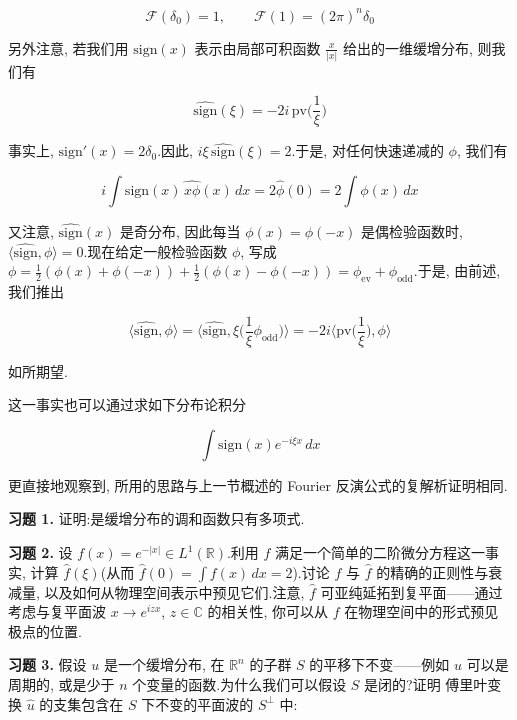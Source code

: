 \begin{equation}
\mathcal{F}(\delta_0) = 1, \qquad \mathcal{F}(1) = (2\pi)^n\delta_0\label{eq:c5-164}
\end{equation}

另外注意, 若我们用 $\mathrm{sign}(x)$ 表示由局部可积函数 $\frac{x}{|x|}$ 给出的一维缓增分布, 则我们有

\begin{equation}
\widehat{\mathrm{sign}}(\xi) = -2i\, \mathrm{pv}\Big(\frac{1}{\xi}\Big)\label{eq:c5-165}
\end{equation}

事实上, $\mathrm{sign}'(x) = 2\delta_0$.因此, $i\xi\, \widehat{\mathrm{sign}}(\xi) = 2$.于是, 对任何快速递减的 $\phi$, 我们有

\[
i\int\mathrm{sign}(x)\, \widehat{x\phi}(x)\, dx = 2\hat{\phi}(0) = 2\int\phi(x)\, dx
\]

又注意, $\widehat{\mathrm{sign}}(x)$ 是奇分布, 因此每当 $\phi(x) = \phi(-x)$ 是偶检验函数时, $\langle\widehat{\mathrm{sign}}, \phi\rangle = 0$.现在给定一般检验函数 $\phi$, 写成 $\phi = \frac{1}{2}(\phi(x)+\phi(-x)) + \frac{1}{2}(\phi(x)-\phi(-x)) = \phi_{\mathrm{ev}} + \phi_{\mathrm{odd}}$.于是, 由前述, 我们推出

\[
\langle\widehat{\mathrm{sign}}, \phi\rangle = \Big\langle\widehat{\mathrm{sign}}, \xi\Big(\frac{1}{\xi}\phi_{\mathrm{odd}}\Big)\Big\rangle = -2i\Big\langle\mathrm{pv}\Big(\frac{1}{\xi}\Big), \phi\Big\rangle
\]

如所期望.

这一事实也可以通过求如下分布论积分

\[
\int\mathrm{sign}(x)e^{-i\xi x}\, dx
\]

更直接地观察到, 所用的思路与上一节概述的 Fourier 反演公式的复解析证明相同.

\textbf{习题 1.} 证明:是缓增分布的调和函数只有多项式.

\textbf{习题 2.} 设 $f(x) = e^{-|x|}\in L^1(\mathbb{R})$.利用 $f$ 满足一个简单的二阶微分方程这一事实, 计算 $\hat{f}(\xi)$(从而 $\hat{f}(0) = \int f(x)\, dx = 2$).讨论 $f$ 与 $\hat{f}$ 的精确的正则性与衰减量, 以及如何从物理空间表示中预见它们.注意, $\hat{f}$ 可亚纯延拓到复平面——通过考虑与复平面波 $x\to e^{izx}$, $z\in\mathbb{C}$ 的相关性, 你可以从 $f$ 在物理空间中的形式预见极点的位置.

\textbf{习题 3.} 假设 $u$ 是一个缓增分布, 在 $\mathbb{R}^n$ 的子群 $S$ 的平移下不变——例如 $u$ 可以是周期的, 或是少于 $n$ 个变量的函数.为什么我们可以假设 $S$ 是闭的?证明 傅里叶变换 $\hat{u}$ 的支集包含在 $S$ 下不变的平面波的  $S^\perp$ 中:


